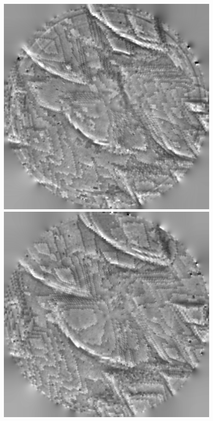 \begin{figure}[!ht]
\centering
{}
  \includegraphics[width=\linewidth]{images/006_X10s50l10m_MOv2_17.png}
  \caption{}\label{fig:cd1}
\endminipage\hfill
{}
  \includegraphics[width=\linewidth]{images/006_X10s50l10m_MOv2_122.png}

\end{figure}
